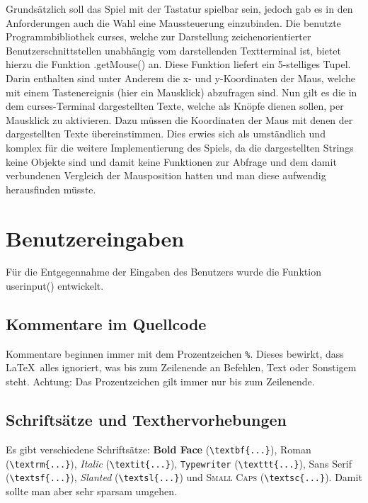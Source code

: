 \documentclass{llncs}
\begin{document}
Grundsätzlich soll das Spiel mit der Tastatur spielbar sein, jedoch gab es in den Anforderungen auch die Wahl eine Maussteuerung einzubinden.
Die benutzte Programmbibliothek \glqq curses\grqq{}, welche zur Darstellung zeichenorientierter Benutzerschnittstellen unabhängig vom darstellenden Textterminal ist,
bietet hierzu die Funktion .getMouse() an. Diese Funktion liefert ein 5-stelliges Tupel. Darin enthalten sind unter Anderem die x- und y-Koordinaten der Maus,
welche mit einem Tastenereignis (hier ein Mausklick) abzufragen sind. Nun gilt es die in dem curses-Terminal dargestellten Texte, welche als Knöpfe dienen sollen,
per Mausklick zu aktivieren. Dazu müssen die Koordinaten der Maus mit denen der dargestellten Texte übereinstimmen. Dies erwies sich als umständlich und komplex für die
weitere Implementierung des Spiels, da die dargestellten Strings keine Objekte sind und damit keine Funktionen zur Abfrage und dem damit verbundenen Vergleich der Mausposition hatten und man diese aufwendig herausfinden müsste.

\section{Benutzereingaben}

Für die Entgegennahme der Eingaben des Benutzers wurde die Funktion \glqq userinput()\grqq{} entwickelt. 

\subsection{Kommentare im Quellcode}

Kommentare beginnen immer mit dem Prozentzeichen \verb!%!. Dieses bewirkt, dass \LaTeX\ alles ignoriert, was bis zum Zeilenende an Befehlen, Text oder Sonstigem steht. Achtung: Das Prozentzeichen gilt immer nur bis zum Zeilenende.

\subsection{Schriftsätze und Texthervorhebungen}

Es gibt verschiedene Schriftsätze: \textbf{Bold Face} (\verb!\textbf{...}!), \textrm{Roman} (\verb!\textrm{...}!), \textit{Italic} (\verb!\textit{...}!), \texttt{Typewriter} (\verb!\texttt{...}!), \textsf{Sans Serif} (\verb!\textsf{...}!), \textsl{Slanted} (\verb!\textsl{...}!) und \textsc{Small Caps} (\verb!\textsc{...}!). Damit sollte man aber sehr sparsam umgehen.
\end{document}
